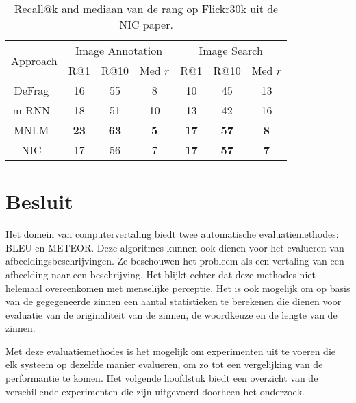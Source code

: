 \begin{table}
	\centering
	\begin{small}
		\setlength{\tabcolsep}{3pt}
		\begin{tabular}{|c|ccc|ccc|}
			\hline
			\multirow{2}{*}{Approach} & \multicolumn{3}{c|}{Image Annotation} & \multicolumn{3}{c|}{Image Search} \\
			& R@1 & R@10 & Med $r$ &  R@1 & R@10 & Med $r$ \\
			\hline
			\hline
			DeFrag~\cite{Karpathy2014} & 16 & 55 & 8             &    10 & 45 & 13  \\
			m-RNN~\cite{Mao2014}         &  18 & 51 & 10               &  13 & 42 & 16\\
			MNLM~\cite{Kiros2014}        &  \textbf{23}   & \textbf{63} & \textbf{5}        &  \textbf{17} & \textbf{57} & \textbf{8}   \\
			\hline
			NIC~\cite{Google}                           &  17 & 56  & 7               &    \textbf{17} & \textbf{57} & \textbf{7} \\
			\hline
		\end{tabular}
	\end{small}
	\caption{Recall@k and mediaan van de rang op Flickr30k uit de NIC paper\cite{Google}.\label{tab:recall@1030k}}
	\label{table:recall}
\end{table}

\section{Besluit}
Het domein van computervertaling biedt twee automatische evaluatiemethodes: BLEU en METEOR. Deze algoritmes kunnen ook dienen voor het evalueren van afbeeldingsbeschrijvingen. Ze beschouwen het probleem als een vertaling van een afbeelding naar een beschrijving. Het blijkt echter dat deze methodes niet helemaal overeenkomen met menselijke perceptie. Het is ook mogelijk om op basis van de gegegeneerde zinnen een aantal statistieken te berekenen die dienen voor evaluatie van de originaliteit van de zinnen, de woordkeuze en de lengte van de zinnen. 

Met deze evaluatiemethodes is het mogelijk om experimenten uit te voeren die elk systeem op dezelfde manier evalueren, om zo tot een vergelijking van de performantie te komen. Het volgende hoofdstuk biedt een overzicht van de verschillende experimenten die zijn uitgevoerd doorheen het onderzoek.


